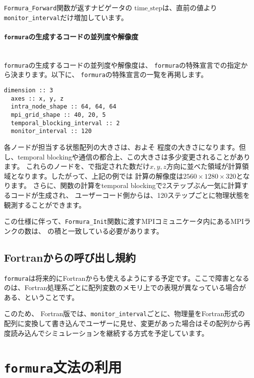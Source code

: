 \documentclass{jsarticle}
\newcommand{\formura}{{\texttt{formura}}}
\begin{document}
 \verb`Formura_Forward`関数が返すナビゲータの
 $\mathrm{time\_step}$は、直前の値より
\verb`monitor_interval`だけ増加しています。

\paragraph{\formura の生成するコードの並列度や解像度} \leavevmode\\

\formura の生成するコードの並列度や解像度は、
\formura の特殊宣言での指定から決まります。以下に、
\formura の特殊宣言の一覧を再掲します。

\begin{lstlisting}[mathescape]
  dimension :: 3
  axes :: x, y, z
  intra_node_shape :: 64, 64, 64
  mpi_grid_shape :: 40, 20, 5
  temporal_blocking_interval :: 2
  monitor_interval :: 120
\end{lstlisting}

各ノードが担当する状態配列の大きさは、およそ
程度の大きさになります。但し、temporal blockingや通信の都合上、この大きさは多少変更されることがあります。
これらのノードを、で指定された数だけ$x,y,z$方向に並べた領域が計算領域となります。したがって、上記の例では
計算の解像度は$2560 \times 1280 \times 320$となります。
さらに、関数の計算をtemporal blockingで2ステップぶん一気に計算するコードが生成され、
ユーザーコード側からは、120ステップごとに物理状態を観測することができます。

この仕様に伴って、\verb`Formura_Init`関数に渡すMPIコミュニケータ内にあるMPIランクの数は、
の積と一致している必要があります。


\subsection{Fortranからの呼び出し規約}

\formura は将来的にFortranからも使えるようにする予定です。ここで障害となるのは、Fortran処理系ごとに配列変数のメモリ上での表現が異なっている場合がある、ということです。

このため、
Fortran版では、\verb`monitor_interval`ごとに、物理量をFortran形式の配列に変換して書き込んでユーザーに見せ、変更があった場合はその配列から再度読み込んでシミュレーションを継続する方式を予定しています。

\newpage
\section{\formura 文法の利用}
\end{document}
